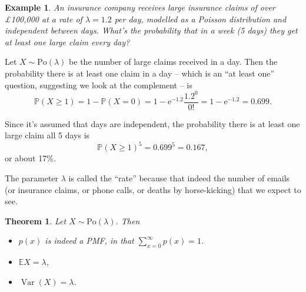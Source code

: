\documentclass[
  a4paper,
]{book}
\providecommand{\tightlist}{%
  \setlength{\itemsep}{0pt}\setlength{\parskip}{0pt}}
\newtheorem{theorem}{Theorem}[chapter]
\theoremstyle{definition}
\theoremstyle{definition}
\newtheorem{example}{Example}[chapter]
\theoremstyle{definition}
\theoremstyle{definition}
\theoremstyle{remark}
\begin{document}
\begin{example}
\emph{An insurance company receives large insurance claims of over £100,000 at a rate of \(\lambda = 1.2\) per day, modelled as a Poisson distribution and independent between days. What's the probability that in a week (5 days) they get at least one large claim every day?}

Let \(X \sim \text{Po}(\lambda)\) be the number of large claims received in a day. Then the probability there is at least one claim in a day -- which is an ``at least one'' question, suggesting we look at the complement -- is
\[ \mathbb P(X \geq 1) = 1 - \mathbb P(X = 0) = 1 - \mathrm e^{-1.2} \frac{1.2^0}{0!} = 1 - \mathrm e^{-1.2} =0.699 .    \]

Since it's assumed that days are independent, the probability there is at least one large claim all 5 days is
\[  \mathbb P(X \geq 1)^5 = 0.699^5 = 0.167, \]
or about 17\%.
\end{example}

The parameter \(\lambda\) is called the ``rate'' because that indeed the number of emails (or insurance claims, or phone calls, or deaths by horse-kicking) that we expect to see.

\begin{theorem}

Let \(X \sim \text{Po}(\lambda)\). Then

\begin{itemize}
\tightlist
\item
  \(p(x)\) is indeed a PMF, in that \(\displaystyle\sum_{x=0}^\infty p(x) = 1\).
\item
  \(\mathbb EX = \lambda\),
\item
  \(\operatorname{Var}(X) = \lambda\).
\end{itemize}

\end{theorem}
\end{document}
